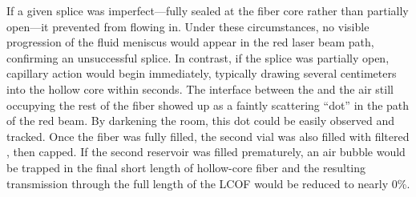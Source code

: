 If a given splice was imperfect—fully sealed at the fiber core rather than partially open—it prevented  from flowing in. Under these circumstances, no visible progression of the fluid meniscus would appear in the red laser beam path, confirming an unsuccessful splice. In contrast, if the splice was partially open, capillary action would begin immediately, typically drawing  several centimeters into the hollow core within seconds. The interface between the  and the air still occupying the rest of the fiber showed up as a faintly scattering “dot” in the path of the red beam. By darkening the room, this dot could be easily observed and tracked. Once the fiber was fully filled, the second vial was also filled with filtered , then capped. If the second reservoir was filled prematurely, an air bubble would be trapped in the final short length of hollow-core fiber and the resulting transmission through the full length of the \ac{LCOF} would be reduced to nearly 0\%.

